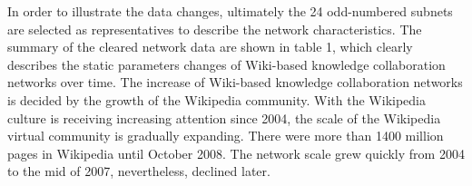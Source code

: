 \documentclass{elsarticle}
\begin{document}
In order to illustrate the data changes, ultimately the 24
odd-numbered subnets are selected as representatives to describe the
network characteristics. The summary of the cleared network data are
shown in table 1, which clearly describes the static parameters
changes of Wiki-based knowledge collaboration networks over time. The
increase of Wiki-based knowledge collaboration networks is decided by
the growth of the Wikipedia community. With the Wikipedia culture is
receiving increasing attention since 2004, the scale of the Wikipedia
virtual community is gradually expanding. There were more than 1400
million pages in Wikipedia until October 2008. The network scale grew
quickly from 2004 to the mid of 2007, nevertheless, declined later.
\begin{table}[htbp]
 

\end{table}
\end{document}
